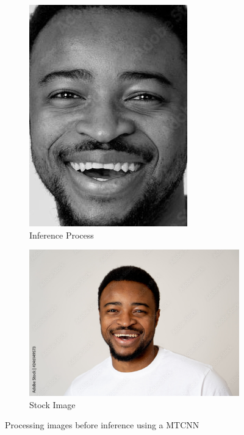 \documentclass{article}
\begin{document}
\begin{figure}[H]
    \centering
    \begin{subfigure}[b]{0.45\textwidth}
        \includegraphics[width=\textwidth]{inference_process}
        \caption{Inference Process}
        \label{fig:inference_process}
    \end{subfigure}
    \hfill
    \begin{subfigure}[b]{0.45\textwidth}
        \includegraphics[width=\textwidth]{stock_image}
        \caption{Stock Image}
        \label{fig:stock_image}
    \end{subfigure}
    \caption{Processing images before inference using a MTCNN}
    \label{fig:two_images}
\end{figure}
\end{document}
